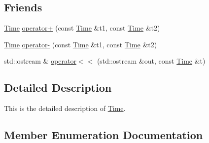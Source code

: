 \subsection*{Friends}
\begin{DoxyCompactItemize}
\item 
\hyperlink{classprism_1_1_time}{Time} \hyperlink{classprism_1_1_time_ae2e555aa5b5c51e44b576d8baf48a2cd}{operator+} (const \hyperlink{classprism_1_1_time}{Time} \&t1, const \hyperlink{classprism_1_1_time}{Time} \&t2)
\item 
\hyperlink{classprism_1_1_time}{Time} \hyperlink{classprism_1_1_time_a09225563b0b317910b26c550ba74de64}{operator-\/} (const \hyperlink{classprism_1_1_time}{Time} \&t1, const \hyperlink{classprism_1_1_time}{Time} \&t2)
\item 
std\+::ostream \& \hyperlink{classprism_1_1_time_a25f100a1404d8c5535ddaafe65081fa7}{operator$<$$<$} (std\+::ostream \&out, const \hyperlink{classprism_1_1_time}{Time} \&t)
\end{DoxyCompactItemize}


\subsection{Detailed Description}
This is the detailed description of \hyperlink{classprism_1_1_time}{Time}. 

\subsection{Member Enumeration Documentation}
